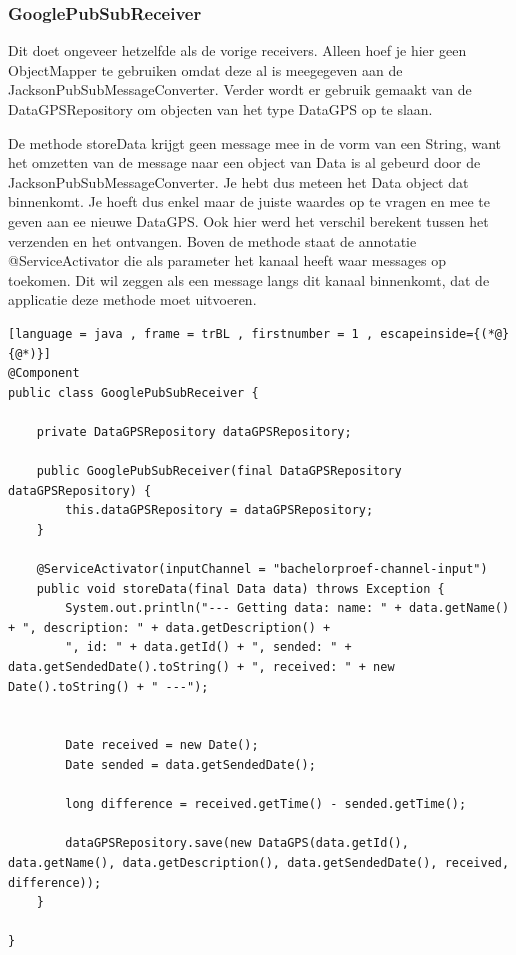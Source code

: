 \subsubsection{GooglePubSubReceiver}
Dit doet ongeveer hetzelfde als de vorige receivers. Alleen hoef je hier geen ObjectMapper te gebruiken omdat deze al is meegegeven aan de JacksonPubSubMessageConverter. Verder wordt er gebruik gemaakt van de DataGPSRepository om objecten van het type DataGPS op te slaan. 

De methode storeData krijgt geen message mee in de vorm van een String, want het omzetten van de message naar een object van Data is al gebeurd door de JacksonPubSubMessageConverter. Je hebt dus meteen het Data object dat binnenkomt. Je hoeft dus enkel maar de juiste waardes op te vragen en mee te geven aan ee nieuwe DataGPS. Ook hier werd het verschil berekent tussen het verzenden en het ontvangen. Boven de methode staat de annotatie @ServiceActivator die als parameter het kanaal heeft waar messages op toekomen. Dit wil zeggen als een message langs dit kanaal binnenkomt, dat de applicatie deze methode moet uitvoeren.
\begin{lstlisting}[language = java , frame = trBL , firstnumber = 1 , escapeinside={(*@}{@*)}]
@Component
public class GooglePubSubReceiver {
    
    private DataGPSRepository dataGPSRepository;
    
    public GooglePubSubReceiver(final DataGPSRepository dataGPSRepository) {
        this.dataGPSRepository = dataGPSRepository;
    }
    
    @ServiceActivator(inputChannel = "bachelorproef-channel-input")
    public void storeData(final Data data) throws Exception {
        System.out.println("--- Getting data: name: " + data.getName() + ", description: " + data.getDescription() +
        ", id: " + data.getId() + ", sended: " + data.getSendedDate().toString() + ", received: " + new Date().toString() + " ---");
        
        
        Date received = new Date();
        Date sended = data.getSendedDate();
        
        long difference = received.getTime() - sended.getTime();
        
        dataGPSRepository.save(new DataGPS(data.getId(), data.getName(), data.getDescription(), data.getSendedDate(), received, difference));
    }
    
}
\end{lstlisting}
